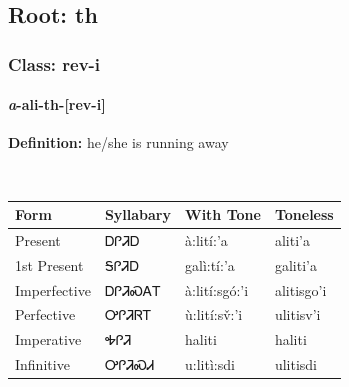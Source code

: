 \needspace{4in}
\subsection*{Root: th}
\nopagebreak
{}
\needspace{3in}
\subsubsection*{Class: rev-i}
\nopagebreak
\needspace{2in}
\paragraph*{\textit{a}{-}ali{-}\textbf{th}{-}[rev-i]}
\nopagebreak
\textbf{Definition: } he/she is running away
\\[0.5em]
\begin{tabularx}{\textwidth}{l X X X}%
\toprule%
\textbf{Form}&\textbf{Syllabary}&\textbf{With Tone}&\textbf{Toneless}\\%
\midrule%
Present&ᎠᎵᏘᎠ&à:lití:’a&aliti’a\\%
1st Present&ᎦᎵᏘᎠ&galì:tí:’a&galiti’a\\%
Imperfective&ᎠᎵᏘᏍᎪᎢ&à:lití:sgó:’i&alitisgo’i\\%
Perfective&ᎤᎵᏘᏒᎢ&ù:lití:sv̌:’i&ulitisv’i\\%
Imperative&ᎭᎵᏘ&haliti&haliti\\%
Infinitive&ᎤᎵᏘᏍᏗ&u:litì:sdi&ulitisdi\\%
\bottomrule%
\end{tabularx}
\\[1em]